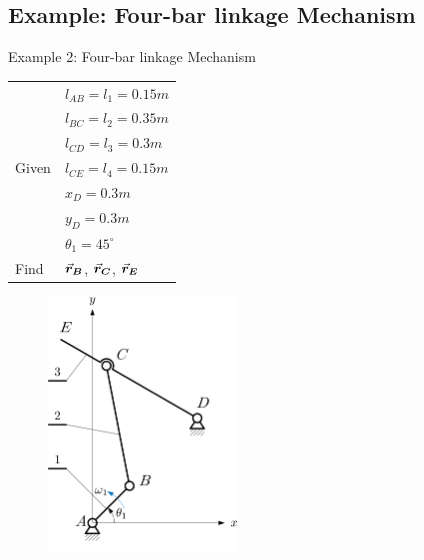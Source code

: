 \subsection{Example: Four-bar linkage Mechanism}

\begin{frame}
	\begin{block}{Example 2: Four-bar linkage Mechanism}
		\begin{table}
			\begin{minipage}{0.5\linewidth}
				\begin{tabular}{l|l}
					& $l_{AB}=l_1=0.15m$\\
					& $l_{BC}=l_2=0.35m$\\
					& $l_{CD}=l_3=0.3m$\\
					Given & $l_{CE}=l_4=0.15m$\\
					& $x_D=0.3m$\\
					& $y_D=0.3m$\\
					& $\theta_1=45^ {\circ}$\\ \hline
					Find & $\vec{\bm{r}}_{\bm{B}}$, $\vec{\bm{r}}_{\bm{C}}$, $\vec{\bm{r}}_{\bm{E}}$\\
				\end{tabular}	
			\end{minipage}\hfill
			\begin{minipage}{0.5\linewidth}
				\begin{figure}
					\includegraphics[width=50mm]{images/R-RRR.png}
				\end{figure}
			\end{minipage}
		\end{table}
	\end{block}
\end{frame}

